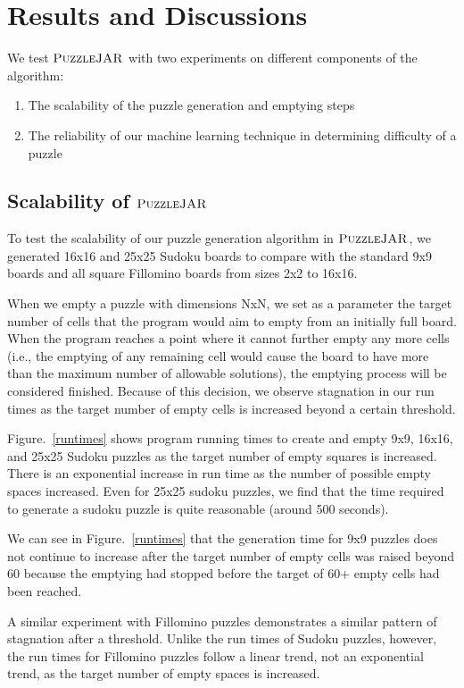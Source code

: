 \section{Results and Discussions}

We test $\textsc{PuzzleJAR}$ with two experiments on different components of the algorithm:
\begin{enumerate}
\item The scalability of the puzzle generation and emptying steps
\item The reliability of our machine learning technique in determining difficulty of a puzzle
\end{enumerate}

\subsection{Scalability of $\textsc{PuzzleJAR}$}

To test the scalability of our puzzle generation algorithm in
$\textsc{PuzzleJAR}$, we generated 16x16 and 25x25 Sudoku boards to compare
with the standard 9x9 boards and all square Fillomino boards from
sizes 2x2 to 16x16.

When we empty a puzzle with dimensions NxN, we set as a parameter the
target number of cells that the program would aim to empty from an
initially full board. When the program reaches a point where it cannot
further empty any more cells (i.e., the emptying of any remaining cell
would cause the board to have more than the maximum number of
allowable solutions), the emptying process will be considered
finished. Because of this decision, we observe stagnation in our run times as
the target number of empty cells is increased beyond a certain
threshold.

Figure.~\ref{runtimes} shows program running times to create and empty 9x9, 16x16, and 25x25 Sudoku puzzles as the target number of empty squares is increased. There is an exponential increase in run time as the number of possible empty spaces increased. Even for 25x25 sudoku puzzles, we find that the time required to generate a sudoku puzzle is quite reasonable (around 500 seconds).

We can see in Figure.~\ref{runtimes} that the generation time for 9x9 puzzles does not continue to increase after the target number of empty cells was raised beyond 60 because the emptying had stopped before the target of 60+ empty cells had been reached. 

A similar experiment with Fillomino puzzles demonstrates a similar pattern of stagnation after a threshold. Unlike the run times of Sudoku puzzles, however, the run times for Fillomino puzzles follow a linear trend, not an exponential trend, as the target number of empty spaces is increased.

